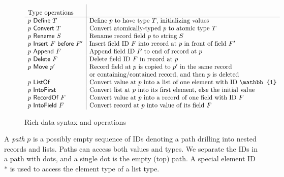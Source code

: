 \documentclass[english,submission]{programming}
\theoremstyle{definition}
\newcommand{\mathbox}[1]{\colorbox{black!10}{$#1$\phantom{i\hspace{-3.5pt}}}}
\begin{document}
\begin{figure}[h]
{\[\begin{array}{l|l}
  \textrm{Type operations} & \rule[0pt]{0pt}{16pt}\\
  \hline
  p \textsf{ Define } T & \textrm{Define $p$ to have type $T$, initializing values}\\
  p \textsf{ Convert } T & \textrm{Convert atomically-typed $p$ to atomic type $T$}\\

  p \textsf{ Rename } S & \textrm{Rename record field $p$ to string $S$}\\

  p \textsf{ Insert } F \textsf{ before } F' & \textrm{Insert field ID $F$ into record at $p$ in front of field $F'$}\\
  p \textsf{ Append } F & \textrm{Append field ID $F$ to end of record at $p$}\\

  p \textsf{ Delete } F & \textrm{Delete field ID $F$ in record at $p$}\\

  p \textsf{ Move } p' & \textrm{Record field at $p$ is copied to $p'$ in the same record}\\
  & \textrm{or containing\slash contained record, and then $p$ is deleted}\\


  p \textsf{ ListOf } & \textrm{Convert value at $p$ into a list of one element with ID $\mathbb{1}$}\\
  p \textsf{ IntoFirst } & \textrm{Convert list at $p$ into its first element, else the initial value} \\

  p \textsf{ RecordOf } F & \textrm{Convert value at $p$ into a record of one field with ID $F$} \\
  p \textsf{ IntoField } F & \textrm{Convert record at $p$ into value of its field $F$} \\

\end{array}\]
}
\vspace{-4pt}
\caption{Rich data syntax and operations}
\label{fig:rich-data}
\end{figure}


A \textit{path} \mathbox{p} is a possibly empty sequence of IDs denoting a path drilling into nested records and lists. Paths can access both values and types. We separate the IDs in a path with dots, and a single dot is the empty (top) path. A special element ID~\mathbox{*} is used to access the element type of a list type.
\end{document}
